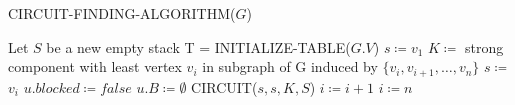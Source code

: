\begin{algorithm}[H]
    \caption{CIRCUIT-FINDING-ALGORITHM($G$)}\label{alg:circuit-finding}
    \begin{algorithmic}[1]
        \State Let $S$ be a new empty stack
        \State T = INITIALIZE-TABLE($G.V$)
        \State $s \coloneqq v_1$
            \State $K \coloneqq$ strong component with least vertex $v_i$
            in subgraph of G induced by $\{v_i, v_{i+1}, \ldots, v_n\}$
                \State $s \coloneqq $ $v_i$
                    \State $u.blocked \coloneqq false$
                    \State $u.B \coloneqq \emptyset$
                \EndFor
                \State CIRCUIT($s, s, K, S$)
                \State $i \coloneqq i + 1$
            \Else
                \State $i \coloneqq n$
            \EndIf
        \EndWhile
    \end{algorithmic}
\end{algorithm}